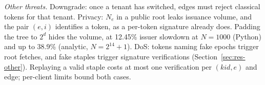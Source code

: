 \emph{Other threats.} Downgrade: once a tenant has switched, edges must reject classical tokens for that tenant. Privacy: $N_e$ in a public root leaks issuance volume, and the pair $(e,i)$ identifies a token, as a per-token signature already does. Padding the tree to $2^d$ hides the volume, at 12.45\% issuer slowdown at $N=1000$ (Python) and up to 38.9\% (analytic, $N=2^{14}+1$). DoS: tokens naming fake epochs trigger root fetches, and fake staples trigger signature verifications (Section~\ref{sec:res-other}). Replaying a valid staple costs at most one verification per $(\mathit{kid},e)$ and edge; per-client limits bound both cases.
